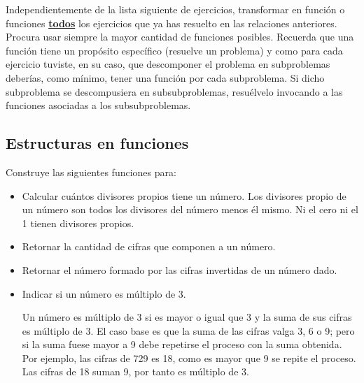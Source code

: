 




Independientemente de la lista siguiente de ejercicios,  transformar en función o funciones \underline{\bf \large todos} los  ejercicios que ya has resuelto en las relaciones anteriores.  Procura usar siempre la mayor cantidad de funciones posibles. Recuerda que una función tiene un propósito específico (resuelve un problema) y como para cada ejercicio tuviste, en su caso, que descomponer el problema en subproblemas deberías, como mínimo, tener una función por cada subproblema. Si dicho subproblema se descompusiera en subsubproblemas, resuélvelo invocando a las funciones asociadas a los subsubproblemas.
 
 



\separacion
\subsection{Estructuras en funciones}

 Construye las siguientes funciones para:
\begin{itemize}
\item Calcular cuántos divisores propios tiene un número. 
Los divisores propio de un número son todos los divisores del número menos él mismo.
Ni el cero  ni el 1 tienen divisores propios.

\item Retornar la cantidad de cifras que componen a un número.

\item  Retornar el número formado por las cifras invertidas de un número dado.

\item Indicar si un número es múltiplo de 3.

Un número es múltiplo de 3 si es mayor o igual que 3 y  la suma de sus cifras es múltiplo de 3. El caso base es que la suma de las cifras valga 3, 6 o 9;  pero si la suma fuese mayor a 9 debe repetirse el proceso con la suma obtenida.  Por ejemplo, las cifras de 729 es 18, como es mayor que 9 se repite el proceso. Las cifras de 18 suman 9, por tanto es múltiplo de 3.
\end{itemize}


